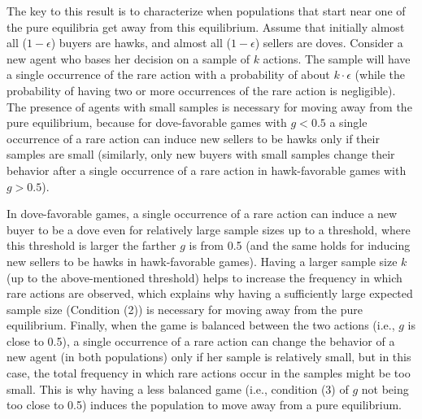 \documentclass[12pt]{article}
\numberwithin{equation}{section}
\numberwithin{figure}{section}
\theoremstyle{definition}
\theoremstyle{plain}
\theoremstyle{plain}
\theoremstyle{plain}
\theoremstyle{remark}
\theoremstyle{plain}
\theoremstyle{plain}
\def\e{\epsilon}
\begin{document}
The key to this result is to characterize when populations that start near one of the pure equilibria get away from this equilibrium.
Assume that initially almost all ($1-\e$) buyers are hawks, and almost all ($1-\e$) sellers are doves. Consider a new agent who bases her decision  on a sample of $k$ actions. The sample will have a single occurrence of the rare action with a probability of about $k\cdot \epsilon$ (while the probability of having two or more occurrences of the rare action is negligible). The presence of agents with small samples is necessary for moving away from the pure equilibrium, because for dove-favorable games with $g<0.5$ a single occurrence of a rare action can induce new sellers to be hawks only if their samples are small 
(similarly, only new buyers  with small samples  change their behavior after a single occurrence of a rare action in hawk-favorable games with $g>0.5$).

In dove-favorable games, a single occurrence of a rare action can induce a new buyer to be a dove  even for 
relatively large sample sizes up to a threshold, 
where this threshold is larger the farther $g$ is from 0.5 
(and the same holds for inducing new sellers to be hawks in hawk-favorable games). Having a larger sample size $k$ (up to the above-mentioned threshold) helps to increase the frequency in which rare actions are observed,  which explains why having a sufficiently large expected sample size (Condition (2)) is necessary for moving away from the pure equilibrium. Finally, when the game is balanced between the two actions (i.e., $g$ is close to 0.5), a single occurrence of a rare action can change the behavior of a new agent (in both populations) only if her sample is relatively small, but in this case, the total frequency in which rare actions occur in the samples might be too small. This is why having a less balanced game 
(i.e., condition (3) of $g$ not being too close to 0.5) induces the population to move away from a pure equilibrium.
\end{document}
